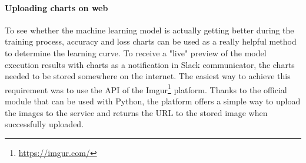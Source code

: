\paragraph{Uploading charts on web}\label{para:charts-web-uploading}
To see whether the machine learning model is actually getting better during the training process, accuracy and loss charts can be used as a really helpful method to determine the learning curve.
To receive a "live" preview of the model execution results with charts as a notification in Slack communicator, the charts needed to be stored somewhere on the internet.
The easiest way to achieve this requirement was to use the API of the Imgur\footnote{\url{https://imgur.com/}} platform.
Thanks to the official module that can be used with Python, the platform offers a simple way to upload the images to the service and returns the URL to the stored image when successfully uploaded.
